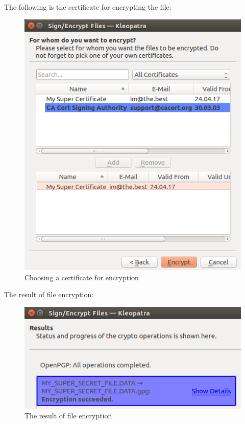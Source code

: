 \documentclass[14pt,a4paper,report]{report}
\begin{document}
The following is the certificate for encrypting the file:

\begin{figure}[h!]
	\centering
	\includegraphics[scale = 0.53]{images/2_3.png}
	\caption{Choosing a certificate for encryption}
\end{figure}

The result of file encryption:

\begin{figure}[h!]
	\centering
	\includegraphics[scale = 0.6]{images/2_4.png}
	\caption{The result of file encryption}
\end{figure}
\end{document}
